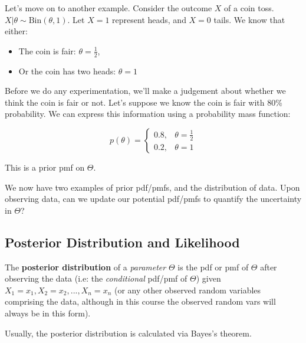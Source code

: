 \documentclass[a4paper]{article}
\begin{document}
                Let's move on to another example. Consider the outcome $X$ of a
                coin toss. $X | \theta \sim \text{Bin}(\theta, 1)$. Let $X = 1$
                represent heads, and $X = 0$ tails. We know that either:

                \begin{itemize}
                    \item The coin is fair: $\theta = \frac{1}{2}$,
                    \item Or the coin has two heads: $\theta = 1$
                \end{itemize}

                Before we do any experimentation, we'll make a judgement about
                whether we think the coin is fair or not. Let's suppose we know
                the coin is fair with 80\% probability. We can express this
                information using a probability mass function:

                \[
                    p(\theta) = \begin{cases}0.8, & \theta = \frac{1}{2} \\ 0.2,
                    & \theta = 1\end{cases}
                \]

                This is a prior pmf on $\Theta$.

                We now have two examples of prior pdf/pmfs, and the distribution
                of data. Upon observing data, can we update our potential
                pdf/pmfs to quantify the uncertainty in $\Theta$?

        \subsection{Posterior Distribution and Likelihood}
            \begin{definition}
                The \textbf{posterior distribution} of a \textit{parameter}
                $\Theta$ is the pdf or pmf of $\Theta$ after observing the data
                (i.e: the \textit{conditional} pdf/pmf of $\Theta$) given $X_1 =
                x_1, X_2 = x_2, ..., X_n = x_n$ (or any other observed random
                variables comprising the data, although in this course the
                observed random vars will always be in this form).
            \end{definition}

            Usually, the posterior distribution is calculated via Bayes's
            theorem.
\end{document}
